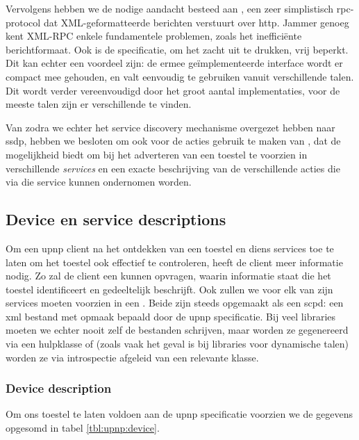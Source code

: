 Vervolgens hebben we de nodige aandacht besteed aan , een zeer simplistisch \ac{rpc}-protocol dat XML-geformatteerde berichten verstuurt over \ac{http}. Jammer genoeg kent XML-RPC enkele fundamentele problemen, zoals het inefficiënte berichtformaat. Ook is de specificatie, om het zacht uit te drukken, vrij beperkt. Dit kan echter een voordeel zijn: de ermee geïmplementeerde interface wordt er compact mee gehouden, en valt eenvoudig te gebruiken vanuit verschillende talen. Dit wordt verder vereenvoudigd door het groot aantal implementaties, voor de meeste talen zijn er verschillende te vinden.

Van zodra we echter het service discovery mechanisme overgezet hebben naar \ac{ssdp}, hebben we besloten om ook voor de acties gebruik te maken van , dat de mogelijkheid biedt om bij het adverteren van een toestel te voorzien in verschillende \emph{services} en een exacte beschrijving van de verschillende acties die via die service kunnen ondernomen worden.

\subsection{Device en service descriptions}

Om een \ac{upnp} client na het ontdekken van een toestel en diens services toe te laten om het toestel ook effectief te controleren, heeft de client meer informatie nodig. Zo zal de client een  kunnen opvragen, waarin informatie staat die het toestel identificeert en gedeeltelijk beschrijft. Ook zullen we voor elk van zijn services moeten voorzien in een . Beide zijn steeds opgemaakt als een \ac{scpd}: een \ac{xml} bestand met opmaak bepaald door de \ac{upnp} specificatie. Bij veel libraries moeten we echter nooit zelf de bestanden schrijven, maar worden ze gegenereerd via een hulpklasse of (zoals vaak het geval is bij libraries voor dynamische talen) worden ze via introspectie afgeleid van een relevante klasse.

\subsubsection{Device description}

Om ons toestel te laten voldoen aan de \ac{upnp} specificatie voorzien we de gegevens opgesomd in tabel \ref{tbl:upnp:device}.

